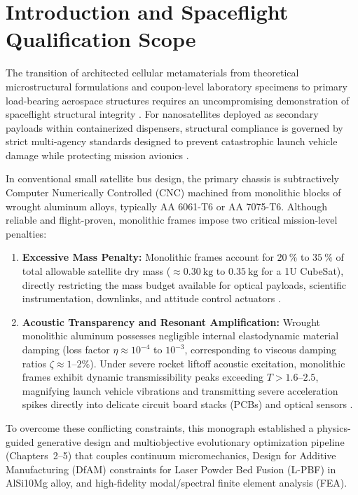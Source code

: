 \section{Introduction and Spaceflight Qualification Scope}
\label{sec:flight_intro}

The transition of architected cellular metamaterials from theoretical microstructural formulations and coupon-level laboratory specimens to primary load-bearing aerospace structures requires an uncompromising demonstration of spaceflight structural integrity \cite{khan2024,slejko2023}. For nanosatellites deployed as secondary payloads within containerized dispensers, structural compliance is governed by strict multi-agency standards designed to prevent catastrophic launch vehicle damage while protecting mission avionics \cite{calpoly2022,nasa2013}.

In conventional small satellite bus design, the primary chassis is subtractively Computer Numerically Controlled (CNC) machined from monolithic blocks of wrought aluminum alloys, typically AA 6061-T6 or AA 7075-T6. Although reliable and flight-proven, monolithic frames impose two critical mission-level penalties:
\begin{enumerate}
\item \textbf{Excessive Mass Penalty:} Monolithic frames account for $\SI{20}{\percent}$ to $\SI{35}{\percent}$ of total allowable satellite dry mass ($\approx \SI{0.30}{\kilo\gram}$ to $\SI{0.35}{\kilo\gram}$ for a 1U CubeSat), directly restricting the mass budget available for optical payloads, scientific instrumentation, downlinks, and attitude control actuators \cite{puigsuari2002,swartwout2023}.
\item \textbf{Acoustic Transparency and Resonant Amplification:} Wrought monolithic aluminum possesses negligible internal elastodynamic material damping (loss factor $\eta \approx 10^{-4}$ to $10^{-3}$, corresponding to viscous damping ratios $\zeta \approx 1\text{--}2\%$). Under severe rocket liftoff acoustic excitation, monolithic frames exhibit dynamic transmissibility peaks exceeding $T > 1.6\text{--}2.5$, magnifying launch vehicle vibrations and transmitting severe acceleration spikes directly into delicate circuit board stacks (PCBs) and optical sensors \cite{sakay2026,malavolta2026}.
\end{enumerate}

To overcome these conflicting constraints, this monograph established a physics-guided generative design and multiobjective evolutionary optimization pipeline (Chapters~2--5) that couples continuum micromechanics, Design for Additive Manufacturing (DfAM) constraints for Laser Powder Bed Fusion (L-PBF) in AlSi10Mg alloy, and high-fidelity modal/spectral finite element analysis (FEA).


